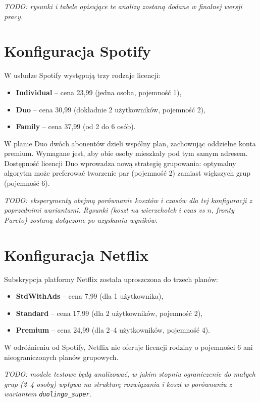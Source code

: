 \emph{TODO: rysunki i tabele opisujące te analizy zostaną dodane w finalnej wersji pracy.}

\section{Konfiguracja Spotify}

W usłudze Spotify występują trzy rodzaje licencji:
\begin{itemize}
  \item \textbf{Individual} -- cena 23,99 (jedna osoba, pojemność 1),
  \item \textbf{Duo} -- cena 30,99 (dokładnie 2 użytkowników, pojemność 2),
  \item \textbf{Family} -- cena 37,99 (od 2 do 6 osób).
\end{itemize}

W planie Duo dwóch abonentów dzieli wspólny plan, zachowując oddzielne konta premium. Wymagane jest, aby obie osoby mieszkały pod tym samym adresem. Dostępność licencji Duo wprowadza nową strategię grupowania: optymalny algorytm może preferować tworzenie par (pojemność 2) zamiast większych grup (pojemność 6).

\emph{TODO: eksperymenty obejmą porównanie kosztów i czasów dla tej konfiguracji z poprzednimi wariantami. Rysunki (koszt na wierzchołek i czas vs $n$, fronty Pareto) zostaną dołączone po uzyskaniu wyników.}

\section{Konfiguracja Netflix}

Subskrypcja platformy Netflix została uproszczona do trzech planów:
\begin{itemize}
  \item \textbf{StdWithAds} -- cena 7,99 (dla 1 użytkownika),
  \item \textbf{Standard} -- cena 17,99 (dla 2 użytkowników, pojemność 2),
  \item \textbf{Premium} -- cena 24,99 (dla 2--4 użytkowników, pojemność 4).
\end{itemize}

W odróżnieniu od Spotify, Netflix nie oferuje licencji rodziny o pojemności 6 ani nieograniczonych planów grupowych.

\emph{TODO: modele testowe będą analizować, w jakim stopniu ograniczenie do małych grup (2--4 osoby) wpływa na strukturę rozwiązania i koszt w porównaniu z wariantem \texttt{duolingo\_super}.}

